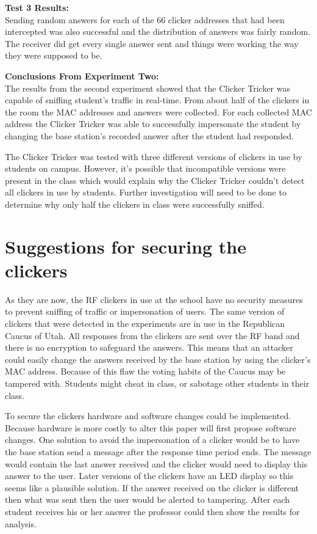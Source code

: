 \textbf{Test 3 Results:}\\
Sending random answers for each of the 66 clicker addresses that had been intercepted was also successful and the distribution of answers was fairly random. The receiver did get every single answer sent and things were working the way they were supposed to be.

\textbf{Conclusions From Experiment Two:}\\
The results from the second experiment showed that the Clicker Tricker was capable of sniffing student's traffic in real-time.  From about half of the clickers in the room the MAC addresses and answers were collected.  For each collected MAC address the Clicker Tricker was able to successfully impersonate the student by changing the base station's recorded answer after the student had responded.

The Clicker Tricker was tested with three different versions of clickers in use by students on campus.  However, it's possible that incompatible versions were present in the class which would explain why the Clicker Tricker couldn't detect all clickers in use by students.  Further investigation will need to be done to determine why only half the clickers in class were successfully sniffed.

\section{Suggestions for securing the clickers}
As they are now, the RF clickers in use at the school have no security measures to prevent sniffing of traffic or impersonation of users.  The same version of clickers that were detected in the experiments are in use in the Republican Caucus of Utah. All responses from the clickers are sent over the RF band and there is no encryption to safeguard the answers.  This means that an attacker could easily change the answers received by the base station by using the clicker's MAC address.  Because of this flaw the voting habits of the Caucus may be tampered with.  Students might cheat in class, or sabotage other students in their class.

To secure the clickers hardware and software changes could be implemented.  Because hardware is more costly to alter this paper will first propose software changes.  One solution to avoid the impersonation of a clicker would be to have the base station send a message after the response time period ends.  The message would contain the last answer received and the clicker would need to display this answer to the user.  Later versions of the clickers have an LED display so this seems like a plausible solution.  If the answer received on the clicker is different then what was sent then the user would be alerted to tampering.  After each student receives his or her answer the professor could then show the results for analysis.

